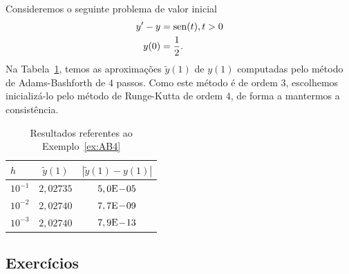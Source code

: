 \begin{ex}\label{ex:AB4}
  Consideremos o seguinte problema de valor inicial
  \begin{align}
    y' - y &= \operatorname{sen}(t), t>0\\
    y(0) &= \frac{1}{2}.
  \end{align}
  Na Tabela~\ref{tab:ex_AB4}, temos as aproximações $\tilde{y}(1)$ de $y(1)$ computadas pelo método de Adams-Bashforth de $4$ passos. Como este método é de ordem $3$, escolhemos inicializá-lo pelo método de Runge-Kutta de ordem $4$, de forma a mantermos a consistência.
 
  \begin{table}[h!]
    \centering
    \begin{tabular}{l|cc}
      $h$ & $\tilde{y}(1)$ & $|\tilde{y}(1)-y(1)|$\\\hline
      $10^{-1}$ & $2,02735$ & $5,0\mathrm{E}\!-\!05$ \\
      $10^{-2}$ & $2,02740$ & $7,7\mathrm{E}\!-\!09$ \\
      $10^{-3}$ & $2,02740$ & $7,9\mathrm{E}\!-\!13$ \\\hline
   \end{tabular}
    \caption{Resultados referentes ao Exemplo~\ref{ex:AB4}}
    \label{tab:ex_AB4}
  \end{table}






\end{ex}

\subsection{Exercícios}

